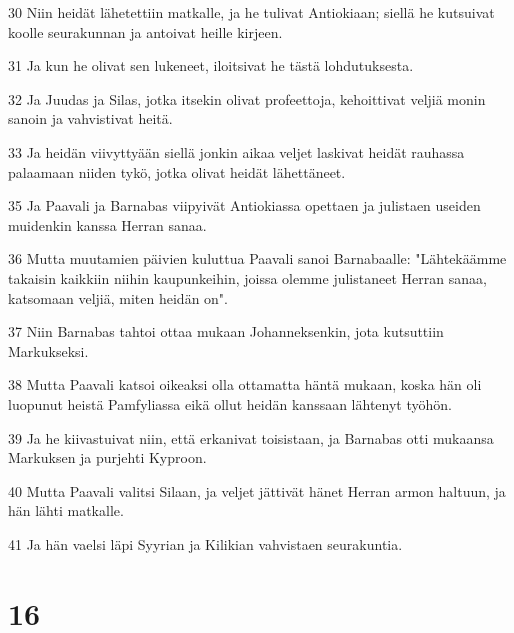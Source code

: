 \par 30 Niin heidät lähetettiin matkalle, ja he tulivat Antiokiaan; siellä he kutsuivat koolle seurakunnan ja antoivat heille kirjeen.
\par 31 Ja kun he olivat sen lukeneet, iloitsivat he tästä lohdutuksesta.
\par 32 Ja Juudas ja Silas, jotka itsekin olivat profeettoja, kehoittivat veljiä monin sanoin ja vahvistivat heitä.
\par 33 Ja heidän viivyttyään siellä jonkin aikaa veljet laskivat heidät rauhassa palaamaan niiden tykö, jotka olivat heidät lähettäneet.
\par 35 Ja Paavali ja Barnabas viipyivät Antiokiassa opettaen ja julistaen useiden muidenkin kanssa Herran sanaa.
\par 36 Mutta muutamien päivien kuluttua Paavali sanoi Barnabaalle: "Lähtekäämme takaisin kaikkiin niihin kaupunkeihin, joissa olemme julistaneet Herran sanaa, katsomaan veljiä, miten heidän on".
\par 37 Niin Barnabas tahtoi ottaa mukaan Johanneksenkin, jota kutsuttiin Markukseksi.
\par 38 Mutta Paavali katsoi oikeaksi olla ottamatta häntä mukaan, koska hän oli luopunut heistä Pamfyliassa eikä ollut heidän kanssaan lähtenyt työhön.
\par 39 Ja he kiivastuivat niin, että erkanivat toisistaan, ja Barnabas otti mukaansa Markuksen ja purjehti Kyproon.
\par 40 Mutta Paavali valitsi Silaan, ja veljet jättivät hänet Herran armon haltuun, ja hän lähti matkalle.
\par 41 Ja hän vaelsi läpi Syyrian ja Kilikian vahvistaen seurakuntia.

\chapter{16}

